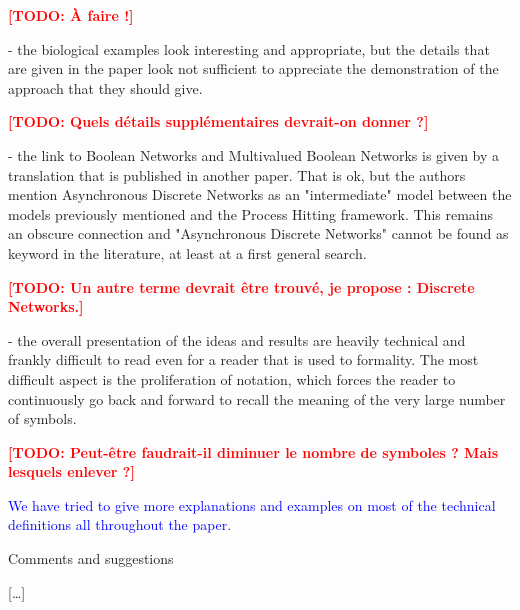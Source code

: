 \documentclass[11pt]{article}
\newcommand{\todo}[1]{\textcolor{red}{\textbf{[TODO: #1]}}}
\newcommand{\answer}[1]{\textcolor{blue}{#1}}
\begin{document}
\todo{À faire !}

- the biological examples look interesting and appropriate, but the details that are given in the paper look not sufficient to appreciate the demonstration of the approach that they should give.

\todo{Quels détails supplémentaires devrait-on donner ?}

- the link to Boolean Networks and Multivalued Boolean Networks is given by a translation that is published in another paper. That is ok, but the authors mention Asynchronous Discrete Networks as an "intermediate" model between the models previously mentioned and the Process Hitting framework. This remains an obscure connection and "Asynchronous Discrete Networks" cannot be found as keyword in the literature, at least at a first general search. 

\todo{Un autre terme devrait être trouvé, je propose : Discrete Networks.}

- the overall presentation of the ideas and results are heavily technical and frankly difficult to read even for a reader that is used to formality. The most difficult aspect is the proliferation of notation, which forces the reader to continuously go back and forward to recall the meaning of the very large number of symbols. 

\todo{Peut-être faudrait-il diminuer le nombre de symboles ? Mais lesquels enlever ?}

\answer{
We have tried to give more explanations and examples
on most of the technical definitions all throughout the paper.
}

Comments and suggestions

[…]
\end{document}
